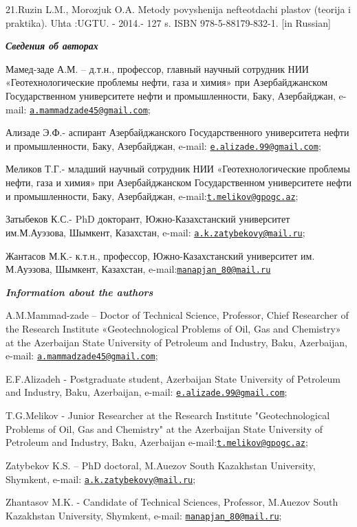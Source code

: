 21.Ruzin L.M., Morozjuk O.A. Metody povyshenija nefteotdachi plastov
(teorija i praktika). Uhta :UGTU. - 2014.- 127 s. ISBN
978-5-88179-832-1. {[}in Russian{]}

\emph{{\bfseries Сведения об авторах}}

Мамед-заде А.М. -- д.т.н., профессор, главный научный сотрудник НИИ
«Геотехнологические проблемы нефти, газа и химия» при Азербайджанском
Государственном университете нефти и промышленности, Баку, Азербайджан,
e-mail:
\href{mailto:a.mammadzade45@gmail.com}{\nolinkurl{a.mammadzade45@gmail.com}};

Ализаде Э.Ф.- аспирант Азербайджанского Государственного университета
нефти и промышленности, Баку, Азербайджан, e-mail:
\href{mailto:e.alizade.99@gmail.com}{\nolinkurl{e.alizade.99@gmail.com}};

Меликов Т.Г.- младший научный сотрудник НИИ «Геотехнологические проблемы
нефти, газа и химия» при Азербайджанском Государственном университете
нефти и промышленности, Баку, Азербайджан,
e-mail:\href{mailto:t.melikov@gpogc.az}{\nolinkurl{t.melikov@gpogc.az}};

Затыбеков К.С.- PhD докторант, Южно-Казахстанский университет
им.М.Ауэзова, Шымкент, Казахстан, e-mail:
\href{mailto:a.k.zatybekovy@mail.ru}{\nolinkurl{a.k.zatybekovy@mail.ru}};

Жантасов М.К.- к.т.н., профессор, Южно-Казахстанский университет им.
М.Ауэзова, Шымкент, Казахстан,
e-mail:\href{mailto:manapjan_80@mail.ru}{\nolinkurl{manapjan\_80@mail.ru}}

\emph{{\bfseries Information about the authors}}

A.M.Mammad-zade -- Doctor of Technical Science, Professor, Chief
Researcher of the Research Institute «Geotechnological Problems of Oil,
Gas and Chemistry» at the Azerbaijan State University of Petroleum and
Industry, Baku, Azerbaijan, e-mail:
\href{mailto:a.mammadzade45@gmail.com}{\nolinkurl{a.mammadzade45@gmail.com}};

E.F.Alizadeh - Postgraduate student, Azerbaijan State University of
Petroleum and Industry, Baku, Azerbaijan, e-mail:
\href{mailto:e.alizade.99@gmail.com}{\nolinkurl{e.alizade.99@gmail.com}};

T.G.Melikov - Junior Researcher at the Research Institute
"Geotechnological Problems of Oil, Gas and Chemistry" at the Azerbaijan
State University of Petroleum and Industry, Baku, Azerbaijan
e-mail:\href{mailto:t.melikov@gpogc.az}{\nolinkurl{t.melikov@gpogc.az}};

Zatybekov K.S. -- PhD doctoral, M.Auezov South Kazakhstan University,
Shymkent, e-mail:
\href{mailto:a.k.zatybekovy@mail.ru}{\nolinkurl{a.k.zatybekovy@mail.ru}};

Zhantasov M.K. - Candidate of Technical Sciences, Professor, M.Auezov
South Kazakhstan University, Shymkent, e-mail:
\href{mailto:manapjan_80@mail.ru}{\nolinkurl{manapjan\_80@mail.ru}};
